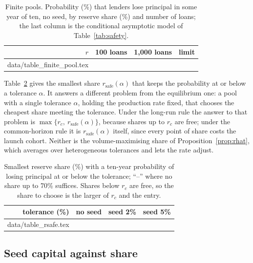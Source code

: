 \documentclass[preprint,11pt,authoryear]{elsarticle}
\makeatletter
\theoremstyle{definition}
\newcommand{\inputrows}[1]{\@@input #1 }
\makeatother
\begin{document}
\begin{table}[ht]
  \centering\small
  \caption{Finite pools. Probability (\%) that lenders lose principal in some year of ten, no seed, by reserve share
  (\%) and number of loans; the last column is the conditional asymptotic model of Table~\ref{tab:safety}.}
  \label{tab:finite}
  \begin{tabular}{rrrr}
    \toprule
    $r$ & 100 loans & 1,000 loans & limit \\
    \midrule
    \inputrows{data/table_finite_pool.tex}
    \bottomrule
  \end{tabular}
\end{table}

Table~\ref{tab:rsafe} gives the smallest share $r_{\mathrm{safe}}(\alpha)$ that keeps the probability at or below a
tolerance $\alpha$. It answers a different problem from the equilibrium one: a pool with a single tolerance $\alpha$,
holding the production rate fixed, that chooses the cheapest share meeting the tolerance. Under the long-run rule the
answer to that problem is $\max\{r_c,\ r_{\mathrm{safe}}(\alpha)\}$, because shares up to $r_c$ are free; under the
common-horizon rule it is $r_{\mathrm{safe}}(\alpha)$ itself, since every point of share costs the launch cohort. Neither
is the volume-maximising share of Proposition~\ref{prop:rhat}, which averages over heterogeneous tolerances and lets
the rate adjust.

\begin{table}[ht]
  \centering\small
  \caption{Smallest reserve share (\%) with a ten-year probability of losing principal at or below the tolerance;
  ``--'' where no share up to 70\% suffices. Shares below $r_c$ are free, so the share to choose is the larger of
  $r_c$ and the entry.}
  \label{tab:rsafe}
  \begin{tabular}{rrrr}
    \toprule
    tolerance (\%) & no seed & seed 2\% & seed 5\% \\
    \midrule
    \inputrows{data/table_rsafe.tex}
    \bottomrule
  \end{tabular}
\end{table}

\subsection{Seed capital against share}
\end{document}
